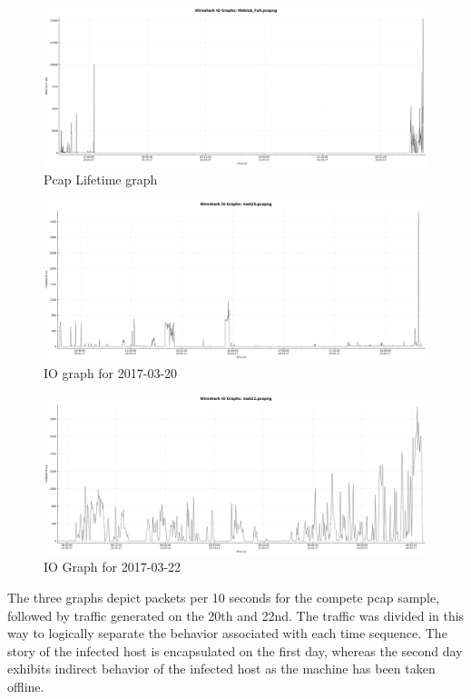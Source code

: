 \documentclass[11pt]{diazessay} %
\begin{document}
\begin{figure}[H]
        \centering
        \includegraphics[scale=0.28]{Maktub_Full.png}
    \caption{Pcap Lifetime graph}
\end{figure}

\begin{figure}[H]
        \centering
        \includegraphics[scale=0.28]{mak20.png}
    \caption{IO graph for 2017-03-20} 
\end{figure}

\begin{figure}[H]
        \centering
        \includegraphics[scale=0.28]{mak22.png}
    \caption{IO Graph for 2017-03-22}
\end{figure}

The three graphs depict packets per 10 seconds for the compete pcap sample, followed by traffic generated on the 20th and 22nd. The traffic was divided in this way to logically separate the behavior associated with each time sequence. The story of the infected host is encapsulated on the first day, whereas the second day exhibits indirect behavior of the infected host as the machine has been taken offline.  
\end{document}
